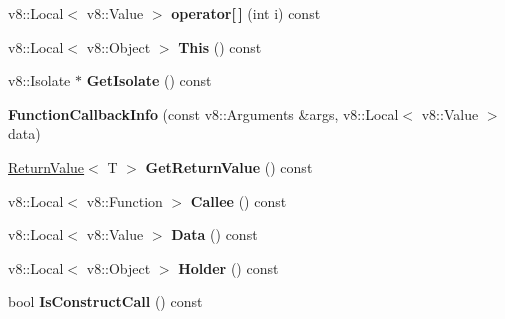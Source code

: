 \begin{DoxyCompactItemize}
\mbox{\label{class_function_callback_info_a1e0d0e57964f34fe226aedeb47681cb6}} 
v8\+::\+Local$<$ v8\+::\+Value $>$ {\bfseries operator\mbox{[}$\,$\mbox{]}} (int i) const
\item 
\mbox{\label{class_function_callback_info_add207630ee3270be2d785fb2c79b2c0a}} 
v8\+::\+Local$<$ v8\+::\+Object $>$ {\bfseries This} () const
\item 
\mbox{\label{class_function_callback_info_a8f3fb3e66b3d778b2e92b0aea6cb3e04}} 
v8\+::\+Isolate $\ast$ {\bfseries Get\+Isolate} () const
\item 
\mbox{\label{class_function_callback_info_a6133a226a58e16ca61758c4aaa931c86}} 
{\bfseries Function\+Callback\+Info} (const v8\+::\+Arguments \&args, v8\+::\+Local$<$ v8\+::\+Value $>$ data)
\item 
\mbox{\label{class_function_callback_info_a5d7d710a75bf076c29cbd8cc9b74682b}} 
\hyperlink{class_return_value}{Return\+Value}$<$ T $>$ {\bfseries Get\+Return\+Value} () const
\item 
\mbox{\label{class_function_callback_info_a8b1709aa2645d4243d5798e0c3d6c1ab}} 
v8\+::\+Local$<$ v8\+::\+Function $>$ {\bfseries Callee} () const
\item 
\mbox{\label{class_function_callback_info_a2c82e7729aead21fa9ac632a40c81083}} 
v8\+::\+Local$<$ v8\+::\+Value $>$ {\bfseries Data} () const
\item 
\mbox{\label{class_function_callback_info_ae4c0667a31ad97de66ba4f08f4c542b9}} 
v8\+::\+Local$<$ v8\+::\+Object $>$ {\bfseries Holder} () const
\item 
\mbox{\label{class_function_callback_info_afa9003e3d8e94dbec2a8ed91bea78140}} 
bool {\bfseries Is\+Construct\+Call} () const
\item 
\mbox{\label{class_function_callback_info_a7a45349f55883b88bee3341a74fbfd81}} 

\end{DoxyCompactItemize}
